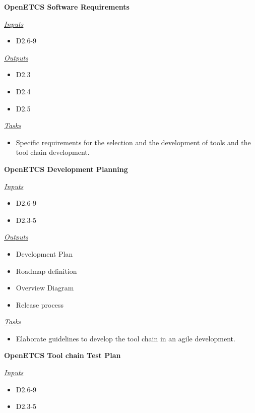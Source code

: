 \documentclass{template/openetcs_article}
\begin{document}
\begin{description}
\item \textbf{OpenETCS Software Requirements}

\underline{\textit{Inputs}}
\begin{itemize}
\item D2.6-9
\end{itemize}


\underline{\textit{Outputs}}
\begin{itemize}
\item D2.3
\item D2.4
\item D2.5
\end{itemize}


\underline{\textit{Tasks}}
\begin{itemize}
\item Specific requirements for the selection and the development of
  tools and the tool chain development.
\end{itemize}

\item \textbf{OpenETCS Development Planning}

\underline{\textit{Inputs}}
\begin{itemize}
\item D2.6-9
\item D2.3-5
\end{itemize}


\underline{\textit{Outputs}}
\begin{itemize}
\item Development Plan
\item Roadmap definition
\item Overview Diagram
\item Release process
\end{itemize}


\underline{\textit{Tasks}}
\begin{itemize}
\item Elaborate guidelines to develop the tool chain in an agile
  development.
\end{itemize}

\item \textbf{OpenETCS Tool chain Test Plan}

\underline{\textit{Inputs}}
\begin{itemize}
\item D2.6-9
\item D2.3-5
\end{itemize}



\end{description}
\end{document}
